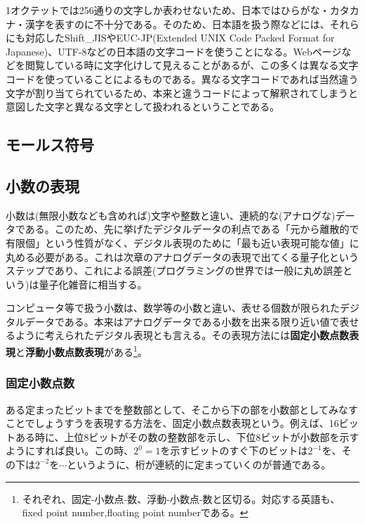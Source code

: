 1オクテットでは256通りの文字しか表わせないため、日本ではひらがな・カタカナ・漢字を表すのに不十分である。そのため、日本語を扱う際などには、それらにも対応したShift\_JISやEUC-JP(Extended UNIX Code Packed Format for Japanese)、UTF-8などの日本語の文字コードを使うことになる。Webページなどを閲覧している時に文字化けして見えることがあるが、この多くは異なる文字コードを使っていることによるものである。異なる文字コードであれば当然違う文字が割り当てられているため、本来と違うコードによって解釈されてしまうと意図した文字と異なる文字として扱われるということである。

\subsection{モールス符号}

\subsection{小数の表現}
小数は(無限小数なども含めれば)文字や整数と違い、連続的な(アナログな)データである。このため、先に挙げたデジタルデータの利点である「元から離散的で有限個」という性質がなく、デジタル表現のために「最も近い表現可能な値」に丸める必要がある。これは次章のアナログデータの表現で出てくる量子化というステップであり、これによる誤差(プログラミングの世界では一般に丸め誤差という)は量子化雑音に相当する。

コンピュータ等で扱う小数は、数学等の小数と違い、表せる個数が限られたデジタルデータである。本来はアナログデータである小数を出来る限り近い値で表せるように考えられたデジタル表現とも言える。その表現方法には\textbf{固定小数点数表現}と\textbf{浮動小数点数表現}がある\footnote{それぞれ、固定-小数点-数、浮動-小数点-数と区切る。対応する英語も、fixed point number,floating point numberである。}。

\subsubsection{固定小数点数}
ある定まったビットまでを整数部として、そこから下の部を小数部としてみなすことでしょうすうを表現する方法を、固定小数点数表現という。例えば、16ビットある時に、上位8ビットがその数の整数部を示し、下位8ビットが小数部を示すようにすれば良い。この時、$2^0=1$を示すビットのすぐ下のビットは$2^{-1}$を、その下は$2^{-2}$を$\cdots$というように、桁が連続的に定まっていくのが普通である。

